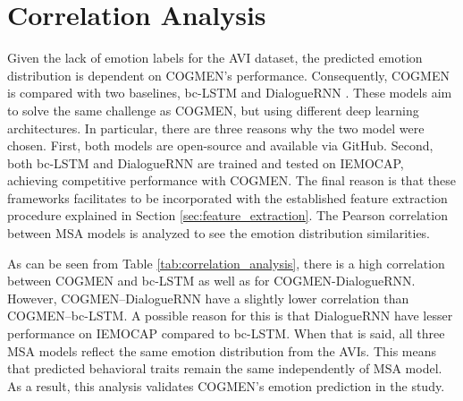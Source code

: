 \section{Correlation Analysis}
Given the lack of emotion labels for the AVI dataset, the predicted emotion distribution is dependent on COGMEN's performance. Consequently, COGMEN is compared with two baselines, bc-LSTM\cite{bc-LSTM_poria2017context} and DialogueRNN \cite{DialogueRNN_MAJUMDER2018124}. These models aim to solve the same challenge as COGMEN, but using different deep learning architectures. In particular, there are three reasons why the two model were chosen. First, both models are open-source and available via GitHub. Second, both bc-LSTM and DialogueRNN are trained and tested on IEMOCAP, achieving competitive performance with COGMEN. The final reason is that these frameworks facilitates to be incorporated with the established feature extraction procedure explained in Section \ref{sec:feature_extraction}. The Pearson correlation between MSA models is analyzed to see the emotion distribution similarities. 
%
\begin{table}[h]
\caption{Correlation for emotions distribution between MSA models.}
\centering
{}
\label{tab:correlation_analysis}
\end{table}
%
As can be seen from Table \ref{tab:correlation_analysis}, there is a high correlation between COGMEN and bc-LSTM as well as for COGMEN-DialogueRNN. However, COGMEN--DialogueRNN have a slightly lower correlation than COGMEN--bc-LSTM. A possible reason for this is that DialogueRNN have lesser performance on IEMOCAP compared to bc-LSTM. When that is said, all three MSA models reflect the same emotion distribution from the AVIs. This means that predicted behavioral traits remain the same independently of MSA model. As a result, this analysis validates COGMEN's emotion prediction in the study. 

